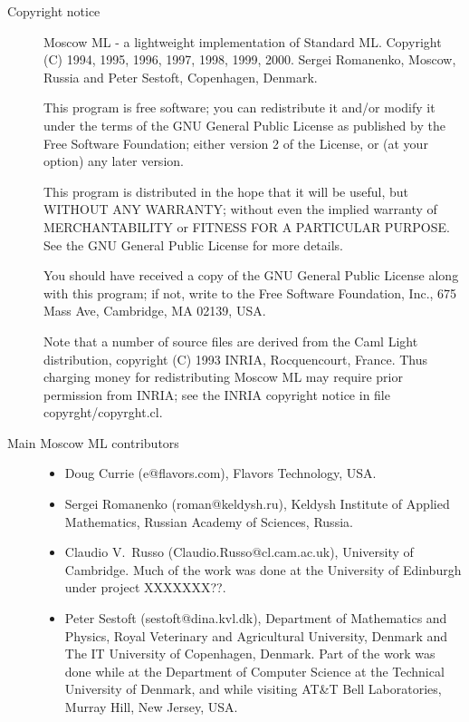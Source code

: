 \documentclass[fleqn]{article}
\begin{document}
\begin{description}
\item[Copyright notice] Moscow ML - a lightweight implementation of
  Standard ML\@.  Copyright (C) 1994, 1995, 1996, 1997, 1998, 1999,
  2000.  Sergei Romanenko, Moscow, Russia and Peter Sestoft,
  Copenhagen, Denmark.

This program is free software; you can redistribute it and/or
modify it under the terms of the GNU General Public License
as published by the Free Software Foundation; either version 2
of the License, or (at your option) any later version.

This program is distributed in the hope that it will be useful,
but WITHOUT ANY WARRANTY; without even the implied warranty of
MERCHANTABILITY or FITNESS FOR A PARTICULAR PURPOSE.  See the
GNU General Public License for more details.

You should have received a copy of the GNU General Public License
along with this program; if not, write to the Free Software
Foundation, Inc., 675 Mass Ave, Cambridge, MA 02139, USA.

Note that a number of source files are derived from the Caml Light
distribution, copyright (C) 1993 INRIA, Rocquencourt, France.
Thus charging money for redistributing Moscow ML may require prior
permission from INRIA; see the INRIA copyright notice in file
copyrght/copyrght.cl.\\[2ex]


\item[Main Moscow ML contributors] 
  \begin{itemize}
  \item Doug Currie (e@flavors.com), Flavors Technology, USA.
  \item Sergei Romanenko (roman@keldysh.ru), Keldysh Institute of
    Applied Mathematics, Russian Academy of Sciences, Russia.
  \item Claudio V.\ Russo (Claudio.Russo@cl.cam.ac.uk),
    University of Cambridge.  Much of the work was done at the
    University of Edinburgh under project XXXXXXX??.
  \item Peter Sestoft (sestoft@dina.kvl.dk), Department of Mathematics
    and Physics, Royal Veterinary and Agricultural University, Denmark
    and The IT University of Copenhagen, Denmark.  Part of the work
    was done while at the Department of Computer Science at the
    Technical University of Denmark, and while visiting AT\&T 
    Bell Laboratories, Murray Hill, New Jersey, USA.
  \end{itemize}


\end{description}
\end{document}
